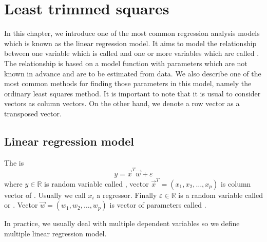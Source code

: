 
\chapter{Least trimmed squares}
In this chapter, we introduce one of the most common regression analysis models which is known as the linear regression model. It aims to model the relationship between one variable which is called  and one or more variables which are called . The relationship is based on a model function with parameters which are not known in advance and are to be estimated from data. We also describe one of the most common methods for finding those parameters in this model, namely the ordinary least squares method. It is important to note that it is usual to consider vectors as column vectors. On the other hand, we denote a row vector as a transposed vector.




\section{Linear regression model}
\begin{definition}\label{definition:lr_model}
    The  is 
\begin{equation}
        y = \vec{x}^T\vec{w} + \varepsilon
\end{equation}
where $y \in \mathbb{R}$ is random variable called , vector $\vec{x}^T = (x_1, x_2, \ldots, x_p)$ is column vector of . Usually we call $x_i$ a regressor. Finally $\varepsilon \in \mathbb{R}$ is a random variable called  or . Vector $\vec{w} = (w_1, w_2, \ldots, w_p)$ is vector of parameters called  . 
\end{definition}
In practice, we usually deal with multiple dependent variables so we define multiple linear regression model.


